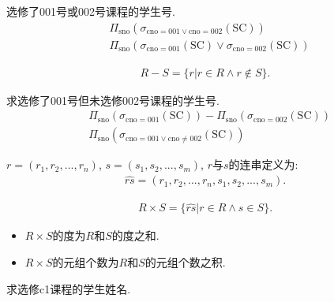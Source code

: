 \begin{example}
选修了001号或002号课程的学生号.
\begin{align*}
    &\Pi_{\text{sno}}(\sigma_{\text{cno}=001\lor \text{cno}=002}(\text{SC})) \\
    &\Pi_{\text{sno}}(\sigma_{\text{cno}=001}(\text{SC})\lor \sigma_{\text{cno}=002}(\text{SC}))
\end{align*}
\end{example}

\begin{definition}[差运算]
\begin{align*}
    R-S =\{r|r\in R\land r \not\in S\}.
\end{align*}
\end{definition}

\begin{example}
求选修了001号但未选修002号课程的学生号.
\begin{align*}
    &\Pi_{\text{sno}}(\sigma_{\text{cno}=001}(\text{SC})) - \Pi_{\text{sno}}(\sigma_{\text{cno}=002}(\text{SC})) \\
   &\Pi_{\text{sno}}(\sigma_{\text{cno}=001\lor \text{cno}\neq 002}(\text{SC}))
\end{align*}
\end{example}

\begin{definition}[连串(Concatenation)]
$r=(r_1,r_2,...,r_n)$, $s=(s_1,s_2,...,s_m)$, $r$与$s$的连串定义为:
\begin{align*}
    \widehat{rs} = (r_1,r_2,...,r_n,s_1,s_2,...,s_m).
\end{align*}
\end{definition}

\begin{definition}[笛卡尔积]
\begin{align*}
    R\times S=\{\widehat{rs}|r\in R\land s\in S\}.
\end{align*}
\begin{itemize}
    \item $R\times S$的度为$R$和$S$的度之和.
    \item $R\times S$的元组个数为$R$和$S$的元组个数之积.
\end{itemize}
\end{definition}

\begin{example}
求选修c1课程的学生姓名.
\end{example}

